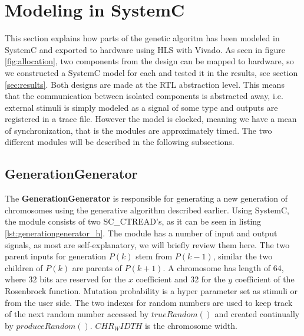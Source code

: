 \section{Modeling in SystemC}

This section explains how parts of the genetic algoritm has been modeled in SystemC and exported to hardware using HLS with Vivado. As seen in figure \ref{fig:allocation}, two components from the design can be mapped to hardware, so we constructed a SystemC model for each and tested it in the results, see section \ref{sec:results}. Both designs are made at the RTL abstraction level. This means that the communication between isolated components is abstracted away, i.e. external stimuli is simply modeled as a signal of some type and outputs are registered in a trace file. However the model is clocked, meaning we have a mean of synchronization, that is the modules are approximately timed. The two different modules will be described in the following subsections.

\subsection{GenerationGenerator}
The \textbf{GenerationGenerator} is responsible for generating a new generation of chromosomes using the generative algorithm described earlier. Using SystemC, the module consists of two SC\_CTREAD's, as it can be seen in listing \ref{lst:generationgenerator_h}. The module has a number of input and output signals, as most are self-explanatory, we will briefly review them here. The two parent inputs for generation $P(k)$ stem from $P(k-1)$, similar the two children of $P(k)$ are parents of $P(k+1)$. A chromosome has length of 64, where 32 bits are reserved for the $x$ coefficient and 32 for the $y$ coefficient of the Rosenbrock function. Mutation probability is a hyper parameter set as stimuli or from the user side. The two indexes for random numbers are used to keep track of the next random number accessed by $trueRandom()$ and created continually by $produceRandom()$.  $CHR_WIDTH$ is the chromosome width.

